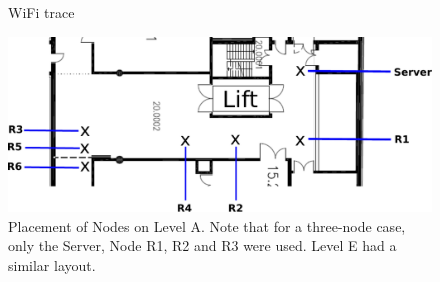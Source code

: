 \documentclass[journal]{IEEEtran}  %
\begin{document}
\begin{figure}
\centering
{}
\caption{WiFi trace}
\label{fig:wifi_trace}
\end{figure}
\begin{figure}[htpb]
\includegraphics[width=\columnwidth]{Tex_Picts/extracted_floorplan_lujia.pdf} 
\caption{Placement of Nodes on Level A. Note that for a three-node case, only
  the Server, Node R1, R2 and R3 were used. Level E had a similar layout.}
\label{fig:node_placement_levelA}
\end{figure}
\end{document}
